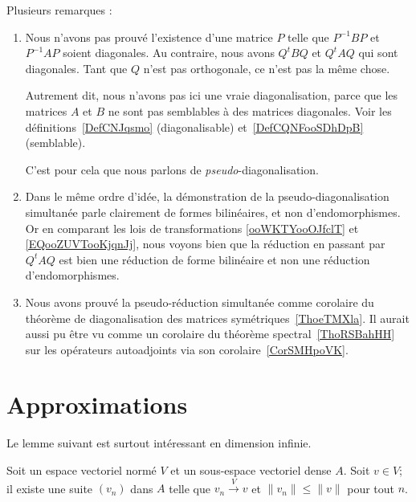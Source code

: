 \begin{remark}      \label{REMooDDUEooJXZIfE}
	Plusieurs remarques :
	\begin{enumerate}
		\item
		      Nous n'avons pas prouvé l'existence d'une matrice \( P\) telle que \( P^{-1}BP\) et \( P^{-1}AP\) soient diagonales. Au contraire, nous avons \( Q^tBQ\) et \( Q^tAQ\) qui sont diagonales. Tant que \( Q\) n'est pas orthogonale, ce n'est pas la même chose.

		      Autrement dit, nous n'avons pas ici une vraie diagonalisation, parce que les matrices \( A\) et \( B\) ne sont pas semblables à des matrices diagonales. Voir les définitions~\ref{DefCNJqsmo} (diagonalisable) et~\ref{DefCQNFooSDhDpB} (semblable).

		      C'est pour cela que nous parlons de \emph{pseudo}-diagonalisation.
		\item
		      Dans le même ordre d'idée, la démonstration de la pseudo-diagonalisation simultanée parle clairement de formes bilinéaires, et non d'endomorphismes. Or en comparant les lois de transformations \eqref{ooWKTYooOJfclT} et \eqref{EQooZUVTooKjqnJj}, nous voyons bien que la réduction en passant par \( Q^tAQ\) est bien une réduction de forme bilinéaire et non une réduction d'endomorphismes.
		\item
		      Nous avons prouvé la pseudo-réduction simultanée comme corolaire du théorème de diagonalisation des matrices symétriques~\ref{ThoeTMXla}. Il aurait aussi pu être vu comme un corolaire du théorème spectral~\ref{ThoRSBahHH} sur les opérateurs autoadjoints via son corolaire~\ref{CorSMHpoVK}.
	\end{enumerate}
\end{remark}

\section{Approximations}

Le lemme suivant est surtout intéressant en dimension infinie.
\begin{lemma}
	Soit un espace vectoriel normé \( V\) et un sous-espace vectoriel dense \( A\). Soit \( v\in V\); il existe une suite \( (v_n)\) dans \( A\) telle que \( v_n\stackrel{V}{\longrightarrow}v\) et \( \| v_n \|\leq \| v \|\) pour tout \( n\).
\end{lemma}


